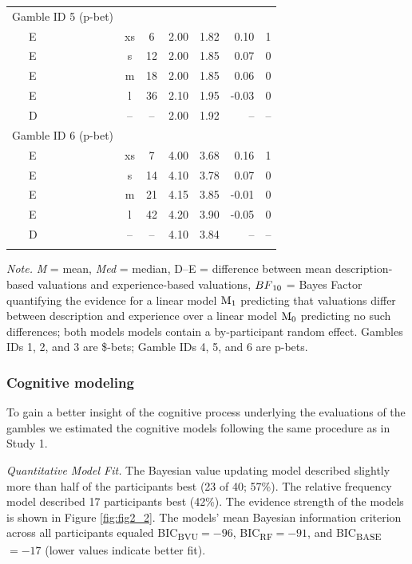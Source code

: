 \documentclass[a4paper, man, floatsintext]{apa6}
\begin{document}
\begin{table}[tbp]
\begin{center}
\begin{threeparttable}
\begin{tabular}{lccccrr}
Gamble ID 5 (p-bet) &  &  &  &  &  & \\
\ \ \ E & xs & 6 & 2.00 & 1.82 & 0.10 & 1\\
\ \ \ E & s & 12 & 2.00 & 1.85 & 0.07 & 0\\
\ \ \ E & m & 18 & 2.00 & 1.85 & 0.06 & 0\\
\ \ \ E & l & 36 & 2.10 & 1.95 & -0.03 & 0\\
\ \ \ D & -- & -- & 2.00 & 1.92 & -- & --\\
Gamble ID 6 (p-bet) &  &  &  &  &  & \\
\ \ \ E & xs & 7 & 4.00 & 3.68 & 0.16 & 1\\
\ \ \ E & s & 14 & 4.10 & 3.78 & 0.07 & 0\\
\ \ \ E & m & 21 & 4.15 & 3.85 & -0.01 & 0\\
\ \ \ E & l & 42 & 4.20 & 3.90 & -0.05 & 0\\
\ \ \ D & -- & -- & 4.10 & 3.84 & -- & --\\
\bottomrule
\addlinespace
\end{tabular}

\begin{tablenotes}[para]
\normalsize{\textit{Note.} \textit{M} = mean, \textit{Med} = median, D--E = difference between mean description-based valuations and experience-based valuations, $BF\textsubscript{10}$ = Bayes Factor quantifying the evidence for a linear model $\mathrm{M}\textsubscript{1}$ predicting that valuations differ between description and experience over a linear model $\mathrm{M}\textsubscript{0}$ predicting no such differences; both models models contain a by-participant random effect. Gambles IDs 1, 2, and 3 are \$-bets; Gamble IDs 4, 5, and 6 are p-bets.}
\end{tablenotes}

\end{threeparttable}
\end{center}

\end{table}

\subsubsection{Cognitive modeling}

To gain a better insight of the cognitive process underlying the evaluations of the gambles we estimated the cognitive models following the same procedure as in Study 1.

\textit{Quantitative Model Fit.} The Bayesian value updating model described slightly more than half of the participants best (23 of 40; 57\%). The relative frequency model described 17 participants best (42\%). The evidence strength of the models is shown in Figure \ref{fig:fig2_2}. The models' mean Bayesian information criterion across
all participants equaled BIC\textsubscript{BVU}\(= -96\),
BIC\textsubscript{RF}\(= -91\), and BIC\textsubscript{BASE}\(= -17\)
(lower values indicate better fit).
\end{document}
